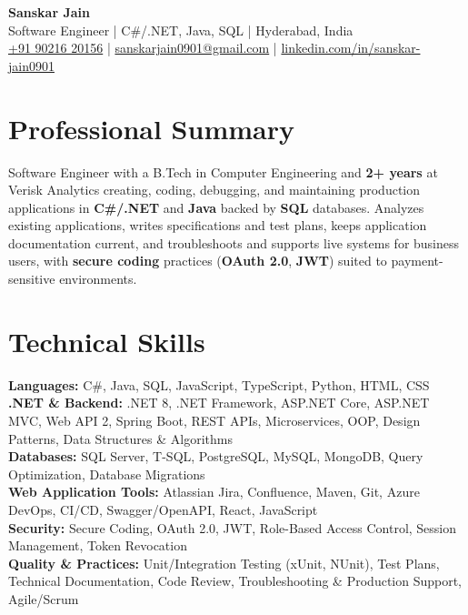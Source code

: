 \documentclass[a4paper,10pt]{article}
\begin{document}
\begin{center}
    {\LARGE \textbf{Sanskar Jain}} \\
    \vspace{2pt}
    Software Engineer \;|\; C\#/.NET, Java, SQL \;|\; Hyderabad, India \\
    \href{tel:+919021620156}{+91 90216 20156} \;|\;
    \href{mailto:sanskarjain0901@gmail.com}{sanskarjain0901@gmail.com} \;|\;
    \href{https://www.linkedin.com/in/sanskar-jain0901/}{linkedin.com/in/sanskar-jain0901}
\end{center}

\section*{Professional Summary}
Software Engineer with a B.Tech in Computer Engineering and \textbf{2+ years} at Verisk Analytics creating, coding, debugging, and maintaining production applications in \textbf{C\#/.NET} and \textbf{Java} backed by \textbf{SQL} databases.
Analyzes existing applications, writes specifications and test plans, keeps application documentation current, and troubleshoots and supports live systems for business users, with \textbf{secure coding} practices (\textbf{OAuth 2.0}, \textbf{JWT}) suited to payment-sensitive environments.

\section*{Technical Skills}
\begin{sloppypar}
\noindent
\textbf{Languages:} C\#, Java, SQL, JavaScript, TypeScript, Python, HTML, CSS \\
\textbf{.NET \& Backend:} .NET 8, .NET Framework, ASP.NET Core, ASP.NET MVC, Web API 2, Spring Boot, REST APIs, Microservices, OOP, Design Patterns, Data Structures \& Algorithms \\
\textbf{Databases:} SQL Server, T-SQL, PostgreSQL, MySQL, MongoDB, Query Optimization, Database Migrations \\
\textbf{Web Application Tools:} Atlassian Jira, Confluence, Maven, Git, Azure DevOps, CI/CD, Swagger/OpenAPI, React, JavaScript \\
\textbf{Security:} Secure Coding, OAuth 2.0, JWT, Role-Based Access Control, Session Management, Token Revocation \\
\textbf{Quality \& Practices:} Unit/Integration Testing (xUnit, NUnit), Test Plans, Technical Documentation, Code Review, Troubleshooting \& Production Support, Agile/Scrum
\end{sloppypar}
\end{document}
